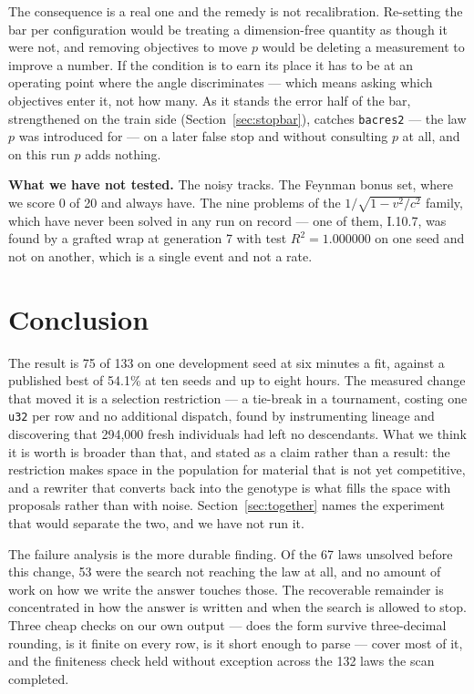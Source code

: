 \documentclass[11pt,a4paper]{article}
\begin{document}
The consequence is a real one and the remedy is not recalibration. Re-setting
the bar per configuration would be treating a dimension-free quantity as though
it were not, and removing objectives to move $p$ would be deleting a measurement
to improve a number. If the condition is to earn its place it has to be at an
operating point where the angle discriminates --- which means asking which
objectives enter it, not how many. As it stands the error half of the bar,
strengthened on the train side (Section~\ref{sec:stopbar}), catches
\texttt{bacres2} --- the law $p$ was introduced for --- on a later false stop
and without consulting $p$ at all, and on this run $p$ adds nothing.

\textbf{What we have not tested.} The noisy tracks. The Feynman bonus set, where
we score 0 of 20 and always have. The nine problems of the
$1/\sqrt{1 - v^2/c^2}$ family, which have never been solved in any run on record
--- one of them, I.10.7, was found by a grafted wrap at generation 7 with test
$R^2 = 1.000000$ on one seed and not on another, which is a single event and not
a rate.

\section{Conclusion}

The result is 75 of 133 on one development seed at six minutes a fit, against a
published best of 54.1\% at ten seeds and up to eight hours. The measured change
that moved it is a selection restriction --- a tie-break in a tournament,
costing one \texttt{u32} per row and no additional dispatch, found by
instrumenting lineage and discovering that 294{,}000 fresh individuals had left
no descendants. What we think it is worth is broader than that, and stated as a
claim rather than a result: the restriction makes space in the population for
material that is not yet competitive, and a rewriter that converts back into the
genotype is what fills the space with proposals rather than with noise.
Section~\ref{sec:together} names the experiment that would separate the two, and
we have not run it.

The failure analysis is the more durable finding. Of the 67 laws unsolved before
this change, 53 were the search not reaching the law at all, and no amount of
work on how we write the answer touches those. The recoverable remainder is
concentrated in how the answer is written and when the search is allowed to
stop. Three cheap checks on our own output --- does the form survive
three-decimal rounding, is it finite on every row, is it short enough to parse
--- cover most of it, and the finiteness check held without exception across the
132 laws the scan completed.
\end{document}
